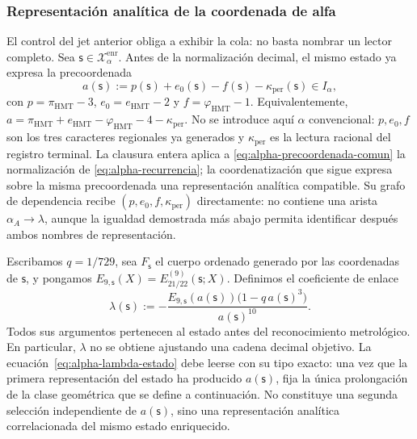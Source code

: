 \subsubsection{Representación analítica de la coordenada de alfa}
\label{subsec:alpha-lector-completo-rev08}

El control del jet anterior obliga a exhibir la cola: no basta nombrar un
lector completo. Sea \(\mathsf s\in\mathcal X_\alpha^{\mathrm{enr}}\). Antes
de la normalización decimal, el mismo estado ya expresa la precoordenada
\begin{equation}
 a(\mathsf s):=p(\mathsf s)+e_0(\mathsf s)-f(\mathsf s)
                 -\kappa_{\mathrm{per}}(\mathsf s)\in I_\alpha,
 \label{eq:alpha-precoordenada-comun}
\end{equation}
con \(p=\pi_{\mathrm{HMT}}-3\),
\(e_0=e_{\mathrm{HMT}}-2\) y
\(f=\varphi_{\mathrm{HMT}}-1\). Equivalentemente,
\(a=\pi_{\mathrm{HMT}}+e_{\mathrm{HMT}}-
\varphi_{\mathrm{HMT}}-4-\kappa_{\mathrm{per}}\). No se introduce aquí
\(\alpha\) convencional: \(p,e_0,f\) son los tres caracteres regionales ya
generados y \(\kappa_{\mathrm{per}}\) es la lectura racional del registro
terminal. La clausura entera aplica a
\eqref{eq:alpha-precoordenada-comun} la normalización de
\eqref{eq:alpha-recurrencia}; la coordenatización que sigue expresa sobre la misma
precoordenada una representación analítica compatible. Su grafo de
dependencia recibe \((p,e_0,f,\kappa_{\mathrm{per}})\) directamente: no
contiene una arista \(\alpha_A\to\lambda\), aunque la igualdad demostrada más
abajo permita identificar después ambos nombres de representación.

Escribamos \(q=1/729\), sea \(F_{\mathsf s}\) el cuerpo ordenado generado por
las coordenadas de \(\mathsf s\), y pongamos
\(E_{9,\mathsf s}(X)=E_{21/22}^{(9)}(\mathsf s;X)\). Definimos el coeficiente
de enlace
\begin{equation}
 \lambda(\mathsf s):=
 -\frac{E_{9,\mathsf s}(a(\mathsf s))
         \bigl(1-q\,a(\mathsf s)^3\bigr)}{a(\mathsf s)^{10}}.
 \label{eq:alpha-lambda-estado}
\end{equation}
Todos sus argumentos pertenecen al estado antes del reconocimiento
metrológico. En particular, \(\lambda\) no se obtiene ajustando una cadena
decimal objetivo. La ecuación~\eqref{eq:alpha-lambda-estado} debe leerse con
su tipo exacto: una vez que la primera representación del estado ha producido
\(a(\mathsf s)\), fija la única prolongación de la clase geométrica que se
define a continuación. No constituye una segunda selección independiente de
\(a(\mathsf s)\), sino una representación analítica correlacionada del mismo
estado enriquecido.

